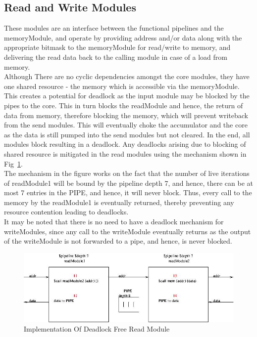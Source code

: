 \documentclass[a4paper,12pt, final]{report}
\begin{document}
\subsection{Read and Write Modules}

These modules are an interface between the functional pipelines and the memoryModule, and operate by providing address and/or data along with the appropriate bitmask to the memoryModule for read/write to memory, and delivering the read data back to the calling module in case of a load from memory.
\\

Although There are no cyclic dependencies amongst the core modules, they have one shared resource - the memory which is accessible via the memoryModule. This creates a potential for deadlock as the input module may be blocked by the pipes to the core. This in turn blocks the readModule and hence, the return of data from memory, therefore blocking the memory, which will prevent writeback from the send modules. This will eventually choke the accumulator and the core as the data is still pumped into the send modules but not cleared. In the end, all modules block resulting in a deadlock. Any deadlocks arising due to blocking of shared resource is mitigated in the read modules using the mechanism shown in Fig~\ref{fig:deadlock}.
\\

The mechanism in the figure works on the fact that the number of live iterations of readModule1 will be bound by the pipeline depth 7, and hence, there can be at most 7 entries in the PIPE, and hence, it will never block. Thus, every call to the memory by the readModule1 is eventually returned, thereby preventing any resource contention leading to deadlocks.
\\

It may be noted that there is no need to have a deadlock mechanism for writeModules, since any call to the writeModule eventually returns as the output of the writeModule is not forwarded to a pipe, and hence, is never blocked.

\begin{figure}[h!]
    \centering
    \includegraphics[width=\textwidth]{Deadlock.jpg}
    \caption{Implementation Of Deadlock Free Read Module}
    \label{fig:deadlock}
\end{figure}
\end{document}
